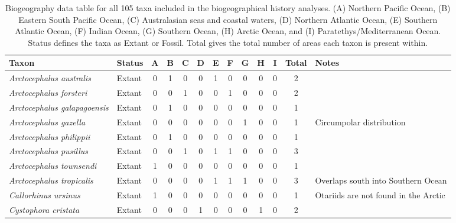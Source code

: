 \begin{longtable}{llccccccccccp{}}

\caption{Biogeography data table for all 105 taxa included in the biogeographical history analyses. (A) Northern Pacific Ocean, (B) Eastern South Pacific Ocean, (C) Australasian seas and coastal waters, (D) Northern Atlantic Ocean, (E) Southern Atlantic Ocean, (F) Indian Ocean, (G) Southern Ocean, (H) Arctic Ocean, and (I) Paratethys/Mediterranean Ocean. Status defines the taxa as Extant or Fossil. Total gives the total number of areas each taxon is present within.}\\

\hline
\textbf{Taxon} & \textbf{Status} & \textbf{A} & \textbf{B} & \textbf{C} & \textbf{D} & \textbf{E} & \textbf{F}
& \textbf{G} & \textbf{H} & \textbf{I} & \textbf{Total} & \textbf{Notes}\\
\hline 
\textit{Arctocephalus australis} &
Extant  &
0 &
1 &
0 &
0 &
1 &
0 &
0 &
0 &
0 &
2  &
\\

\textit{Arctocephalus forsteri} &
Extant  &
0 &
0 &
1 &
0 &
0 &
1 &
0 &
0 &
0 &
2  &
\\

\textit{Arctocephalus galapagoensis} &
Extant &
0 &
1 &
0 &
0 &
0 &
0 &
0 &
0 &
0 &
1 &
\\

\textit{Arctocephalus gazella} &
Extant &
0 &
0 &
0 &
0 &
0 &
0 &
1 &
0 &
0 &
1 &
Circumpolar distribution\\

\textit{Arctocephalus philippii} &
Extant &
0 &
1 &
0 &
0 &
0 &
0 &
0 &
0 &
0 &
1 &
\\

\textit{Arctocephalus pusillus} &
Extant &
0 &
0 &
1 &
0 &
1 &
1 &
0 &
0 &
0 &
3 &
\\

\textit{Arctocephalus townsendi} &
Extant &
1 &
0 &
0 &
0 &
0 &
0 &
0 &
0 &
0 &
1 &
\\

\textit{Arctocephalus tropicalis} &
Extant &
0 &
0 &
0 &
0 &
1 &
1 &
1 &
0 &
0 &
3 &
Overlaps south into Southern Ocean\\

\textit{Callorhinus ursinus} &
Extant &
1 &
0 &
0 &
0 &
0 &
0 &
0 &
0 &
0 &
1 &
Otariids are not found in the Arctic\\

\textit{Cystophora cristata} &
Extant &
0 &
0 &
0 &
1 &
0 &
0 &
0 &
1 &
0 &
2 &
\\


\end{longtable}
